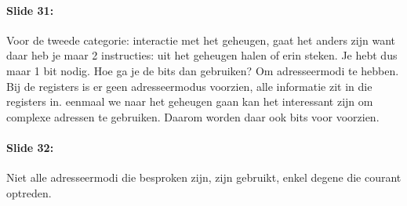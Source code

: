 \documentclass[10pt,a4paper]{book}
\begin{document}
\paragraph{Slide 31:} Voor de tweede categorie: interactie met het geheugen, gaat het anders zijn want daar heb je maar 2 instructies: uit het geheugen halen of erin steken. Je hebt dus maar 1 bit nodig. Hoe ga je de bits dan gebruiken? Om adresseermodi te hebben. Bij de registers is er geen adresseermodus voorzien, alle informatie zit in die registers in. eenmaal we naar het geheugen gaan kan het interessant zijn om complexe adressen te gebruiken. Daarom worden daar ook bits voor voorzien. 

\paragraph{Slide 32:} Niet alle adresseermodi die besproken zijn, zijn gebruikt, enkel degene die courant optreden. 
\end{document}
